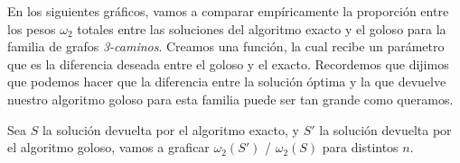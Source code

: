 \vspace{1cm}

En los siguientes gráficos, vamos a comparar empíricamente la proporción entre los pesos $\omega_2$ totales entre las soluciones del algoritmo exacto y el goloso para la familia de grafos \emph{3-caminos}. Creamos una función, la cual recibe un parámetro que es la diferencia deseada entre el goloso y el exacto. Recordemos que dijimos que podemos hacer que la diferencia entre la solución óptima y la que devuelve nuestro algoritmo goloso para esta familia puede ser tan grande como queramos.

Sea $S$ la solución devuelta por el algoritmo exacto, y $S'$ la solución devuelta por el algoritmo goloso, vamos a graficar $\omega_2(S')$ / $\omega_2(S)$ para distintos $n$.


